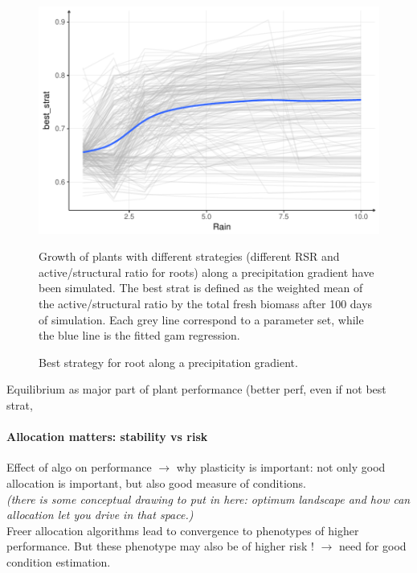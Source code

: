 \documentclass[review]{elsarticle}
\begin{document}
\begin{figure}
\includegraphics[width = \textwidth]{./Figures/best_strat_rain_gradient.pdf}
\caption{Best strategy for root along a precipitation gradient.}

Growth of plants with different strategies (different RSR and active/structural ratio for roots) along a precipitation gradient have been simulated. The best strat is defined as the weighted mean of the active/structural ratio by the total fresh biomass after 100 days of simulation. Each grey line correspond to a parameter set, while the blue line is the fitted gam regression.
\end{figure}

Equilibrium as major part of plant performance (better perf, even if not best strat, 


\paragraph{Allocation matters: stability vs risk}
Effect of algo on performance 
$\rightarrow$ why plasticity is important: not only good allocation is important, but also good measure of conditions.\\
\textit{(there is some conceptual drawing to put in here: optimum landscape and how can allocation let you drive in that space.)}\\

Freer allocation algorithms lead to convergence to phenotypes of higher performance. But these phenotype may also be of higher risk ! $\rightarrow $ need for good condition estimation.\\
\end{document}
